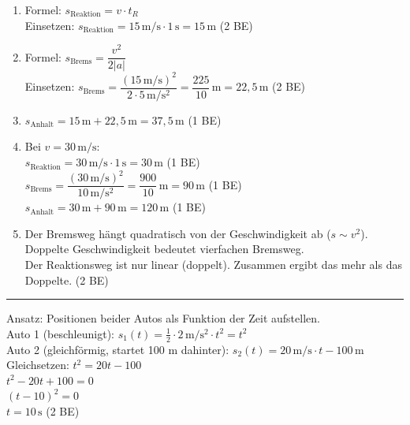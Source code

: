\documentclass[11pt,a4paper]{article}
\newcounter{aufgabe}
\newcommand{\lsg}[1]{\textcolor{correct}{#1}}
\newcommand{\be}[1]{\hfill\textcolor{correct}{\small(#1 BE)}}
\begin{document}
\begin{enumerate}
\item[a)] \lsg{Formel: $s_{\text{Reaktion}} = v \cdot t_R$}\\
\lsg{Einsetzen: $s_{\text{Reaktion}} = 15\,\mathrm{m/s} \cdot 1\,\mathrm{s} = 15\,\mathrm{m}$} \be{2}

\item[b)] \lsg{Formel: $s_{\text{Brems}} = \dfrac{v^2}{2|a|}$}\\
\lsg{Einsetzen: $s_{\text{Brems}} = \dfrac{(15\,\mathrm{m/s})^2}{2 \cdot 5\,\mathrm{m/s^2}} = \dfrac{225}{10}\,\mathrm{m} = 22{,}5\,\mathrm{m}$} \be{2}

\item[c)] \lsg{$s_{\text{Anhalt}} = 15\,\mathrm{m} + 22{,}5\,\mathrm{m} = 37{,}5\,\mathrm{m}$} \be{1}

\item[d)] \lsg{Bei $v = 30\,\mathrm{m/s}$:}\\
\lsg{$s_{\text{Reaktion}} = 30\,\mathrm{m/s} \cdot 1\,\mathrm{s} = 30\,\mathrm{m}$} \be{1}\\
\lsg{$s_{\text{Brems}} = \dfrac{(30\,\mathrm{m/s})^2}{10\,\mathrm{m/s^2}} = \dfrac{900}{10}\,\mathrm{m} = 90\,\mathrm{m}$} \be{1}\\
\lsg{$s_{\text{Anhalt}} = 30\,\mathrm{m} + 90\,\mathrm{m} = 120\,\mathrm{m}$} \be{1}

\item[e)] \lsg{Der Bremsweg hängt quadratisch von der Geschwindigkeit ab ($s \sim v^2$).}\\
\lsg{Doppelte Geschwindigkeit bedeutet vierfachen Bremsweg.}\\
\lsg{Der Reaktionsweg ist nur linear (doppelt). Zusammen ergibt das mehr als das Doppelte.} \be{2}
\end{enumerate}

\vspace{0.3cm}
\hrule
\vspace{0.3cm}

\noindent{}

\vspace{0.3cm}

\lsg{Ansatz: Positionen beider Autos als Funktion der Zeit aufstellen.}\\[0.2cm]
\lsg{Auto 1 (beschleunigt): $s_1(t) = \frac{1}{2} \cdot 2\,\mathrm{m/s^2} \cdot t^2 = t^2$}\\
\lsg{Auto 2 (gleichförmig, startet 100 m dahinter): $s_2(t) = 20\,\mathrm{m/s} \cdot t - 100\,\mathrm{m}$}\\[0.2cm]
\lsg{Gleichsetzen: $t^2 = 20t - 100$}\\
\lsg{$t^2 - 20t + 100 = 0$}\\
\lsg{$(t - 10)^2 = 0$}\\
\lsg{$t = 10\,\mathrm{s}$} \be{2}
\end{document}
